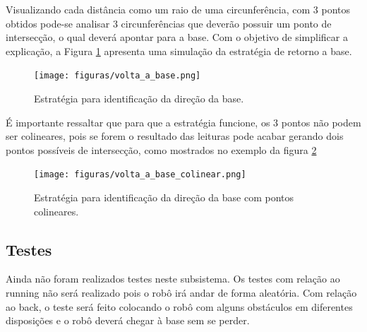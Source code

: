 	 	Visualizando cada distância como um raio de uma circunferência, com 3 pontos obtidos pode-se analisar 3 circunferências que deverão possuir um ponto de intersecção, o qual deverá apontar para a base. Com o objetivo de simplificar a explicação, a Figura \ref{img:back} apresenta uma simulação da estratégia de retorno a base.

	 	\begin{figure}[H]
			\centering
			\texttt{[image: figuras/volta\_a\_base.png]}
			\caption{Estratégia para identificação da direção da base.}
			\label{img:back}
		\end{figure} 

		É importante ressaltar que para que a estratégia funcione, os 3 pontos não podem ser colineares, pois se forem o resultado das leituras pode acabar gerando dois pontos possíveis de intersecção, como mostrados no exemplo da figura \ref{img:back2}

		\begin{figure}[H]
			\centering
			\texttt{[image: figuras/volta\_a\_base\_colinear.png]}
			\caption{Estratégia para identificação da direção da base com pontos colineares.}
			\label{img:back2}
		\end{figure} 

	 \subsection{Testes}
	
		Ainda não foram realizados testes neste subsistema. Os testes com relação ao running não será realizado pois o robô irá andar de forma aleatória. Com relação ao back, o teste será feito colocando o robô com alguns obstáculos em diferentes disposições e o robô deverá chegar à base sem se perder.

